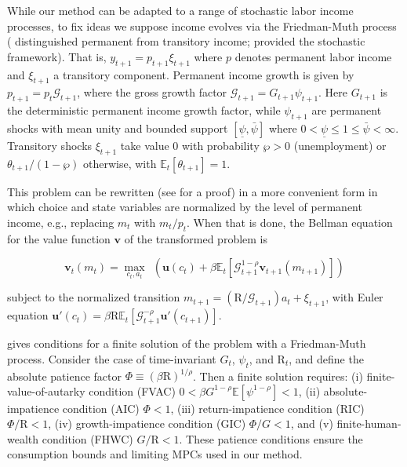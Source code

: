 \documentclass[preprint,authoryear]{elsarticle}
\newcommand{\mNrm}{m}
\newcommand{\cNrm}{c}
\newcommand{\CRRA}{\rho}
\newcommand{\uFunc}{\mathbf{u}}
\newcommand{\DiscFac}{\beta}
\newcommand{\Ex}{\mathbf{\mathbb{E}}}
\newcommand{\aNrm}{a}
\newcommand{\Rfree}{\text{R}}
\newcommand{\yNrm}{y}
\newcommand{\tranShk}{\xi}
\newcommand{\pNrm}{p}
\newcommand{\PermGroShk}{\mathcal{G}}
\newcommand{\PermGroFac}{G}
\newcommand{\permShk}{\psi}
\newcommand{\permShkMin}{\underline{\permShk}}
\newcommand{\permShkMax}{\bar{\permShk}}
\newcommand{\WorstProb}{\wp}
\newcommand{\tranShkEmp}{\theta}
\newcommand{\vFunc}{\mathbf{v}}
\newcommand{\uPrime}{\uFunc'}
\newcommand{\AbsPatFac}{\Phi}
\begin{document}
While our method can be adapted to a range of stochastic labor income processes, to fix ideas we suppose income evolves via the Friedman-Muth process (\citet{Friedman1957} distinguished permanent from transitory income; \citet{Muth1960} provided the stochastic framework).  That is, $\yNrm_{t+1} = \pNrm_{t+1}\tranShk_{t+1}$ where $\pNrm$ denotes permanent labor income and $\tranShk_{t+1}$ a transitory component.  Permanent income growth is given by $\pNrm_{t+1} = \pNrm_{t} \PermGroShk_{t+1}$, where the gross growth factor $\PermGroShk_{t+1} = \PermGroFac_{t+1} \permShk_{t+1}$. Here $\PermGroFac_{t+1}$ is the deterministic permanent income growth factor, while $\permShk_{t+1}$ are permanent shocks with mean unity and bounded support $[\permShkMin, \permShkMax]$ where $0 < \permShkMin \leq 1 \leq \permShkMax < \infty$.  Transitory shocks $\tranShk_{t+1}$ take value 0 with probability $\WorstProb > 0$ (unemployment) or $\tranShkEmp_{t+1}/(1 -\WorstProb)$ otherwise, with $\Ex_t[\tranShkEmp_{t+1}]=1$.

This problem can be rewritten (see \citet{SolvingMicroDSOPs} for a proof) in a more convenient form in which choice and state variables are normalized by the level of permanent income, e.g., replacing $\mNrm_t$ with $\mNrm_t/\pNrm_t$. When that is done, the Bellman equation for the value function $\vFunc$ of the transformed problem is

\begin{equation}
\label{eq:vNormed}
\vFunc_{t}(\mNrm_{t}) = \max_{\cNrm_{t},\aNrm_t} ~~ \left(\uFunc(\cNrm_{t})+\DiscFac \Ex_{t}[ \PermGroShk_{t+1}^{1-\CRRA}\vFunc_{t+1}(\mNrm_{t+1})]\right)
\end{equation}

subject to the normalized transition $\mNrm_{t+1} = (\Rfree/\PermGroShk_{t+1})\aNrm_{t} + \tranShk_{t+1}$, with Euler equation $\uPrime(\cNrm_{t}) = \DiscFac \Rfree \Ex_{t}[ \PermGroShk_{t+1}^{ -\CRRA} \uPrime(\cNrm_{t+1})]$.

\citet{CarrollShanker2024} gives conditions for a finite solution of the problem with a Friedman-Muth process.  Consider the case of time-invariant $\PermGroFac_t$, $\permShk_t$, and $\Rfree_t$, and define the absolute patience factor $\AbsPatFac\equiv(\DiscFac\Rfree)^{1/\CRRA}$.  Then a finite solution requires: (i) finite-value-of-autarky condition (FVAC) $0<\DiscFac\PermGroFac^{1 -\CRRA}\Ex[\permShk^{1 -\CRRA}]<1$, (ii) absolute-impatience condition (AIC) $\AbsPatFac<1$, (iii) return-impatience condition (RIC) $\AbsPatFac/\Rfree<1$, (iv) growth-impatience condition (GIC) $\AbsPatFac/\PermGroFac<1$, and (v) finite-human-wealth condition (FHWC) $\PermGroFac/\Rfree<1$. These patience conditions ensure the consumption bounds and limiting MPCs used in our method.
\end{document}
